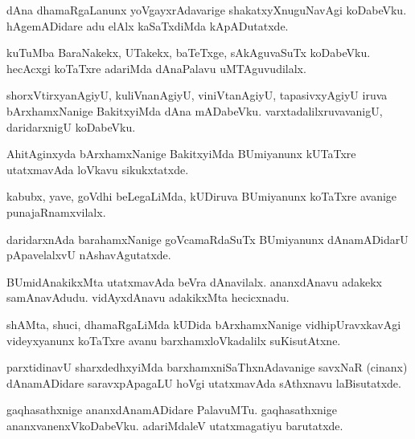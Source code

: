 \documentclass{article}
\begin{document}
\begin{mn}
dAna dhamaRgaLanunx yoVgayxrAdavarige shakatxyXnuguNavAgi koDabeVku. hAgemADidare adu elAlx 
kaSaTxdiMda kApADutatxde.
\end{mn}

\begin{mn}
kuTuMba BaraNakekx, UTakekx, baTeTxge, sAkAguvaSuTx koDabeVku. hecAcxgi koTaTxre adariMda 
dAnaPalavu uMTAguvudilalx.
\end{mn}

\begin{mn}
shorxVtirxyanAgiyU, kuliVnanAgiyU, viniVtanAgiyU, tapasivxyAgiyU iruva bArxhamxNanige 
BakitxyiMda dAna mADabeVku. varxtadalilxruvavanigU, daridarxnigU koDabeVku.
\end{mn}

\begin{mn}
AhitAginxyda bArxhamxNanige BakitxyiMda BUmiyanunx kUTaTxre utatxmavAda loVkavu sikukxtatxde.
\end{mn}

\begin{mn}
kabubx, yave, goVdhi beLegaLiMda, kUDiruva BUmiyanunx koTaTxre avanige punajaRnamxvilalx.
\end{mn}

\begin{mn}
daridarxnAda barahamxNanige goVcamaRdaSuTx BUmiyanunx dAnamADidarU pApavelalxvU nAshavAgutatxde.
\end{mn}

\begin{mn}
BUmidAnakikxMta utatxmavAda beVra dAnavilalx. ananxdAnavu adakekx samAnavAdudu. vidAyxdAnavu 
adakikxMta hecicxnadu.
\end{mn}

\begin{mn}
shAMta, shuci, dhamaRgaLiMda kUDida bArxhamxNanige vidhipUravxkavAgi videyxyanunx koTaTxre avanu
barxhamxloVkadalilx suKisutAtxne.
\end{mn}

\begin{mn}
parxtidinavU sharxdedhxyiMda barxhamxniSaThxnAdavanige savxNaR (cinanx) dAnamADidare saravxpApagaLU
hoVgi utatxmavAda sAthxnavu laBisutatxde.
\end{mn}

\begin{mn}
gaqhasathxnige ananxdAnamADidare PalavuMTu. gaqhasathxnige ananxvanenxVkoDabeVku. adariMdaleV 
utatxmagatiyu barutatxde.
\end{mn}
\end{document}
